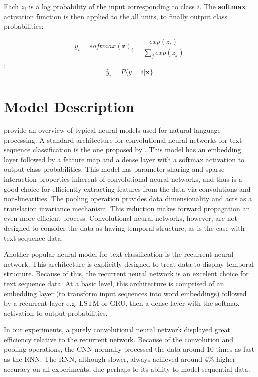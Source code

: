 Each  $z_i$ is a log probability of the input corresponding to class $i$. The \textbf{softmax} activation function is then applied to
the all units, to finally output class probabilities:

\[\hat{y}_i = softmax(\bm{z})_i = \frac{exp(z_i)}{\sum_j exp(z_j)}\],
\[\hat{y}_i = P\{y=i|\bm{x}\}\]

\section{Model Description}

\cite{yin2017comparative} provide an overview of typical neural models used for natural language processing.
A standard architecture for convolutional neural networks for text sequence classification is the one proposed by
\cite{kim2014convolutional}. This model has an embedding layer followed by a feature map and a dense layer with a softmax activation
to output class probabilities. This model has parameter sharing and sparse interaction properties inherent of convolutional
neural networks, and thus is a good choice for efficiently extracting features from the data via convolutions and non-linearities.
The pooling operation provides data dimensionality and acts as a translation invariance mechanism. This reduction makes forward propagation
an even more efficient process. Convolutional neural networks, however, are not designed to consider the data as having temporal
structure, as is the case with text sequence data.

Another popular neural model for text classification is the recurrent neural network. This architecture is explicitly designed to treat
data to display temporal structure. Because of this, the recurrent neural network is an excelent choice for text sequence data.
At a basic level, this architecture is comprised of an embedding layer (to transform input sequences into word embeddings)
followed by a recurrent layer e.g. LSTM or GRU, then a dense layer with the softmax activation to output probabilities.

In our experiments, a purely convolutional neural network displayed great efficiency relative to the recurrent network. Because of the convolution
and pooling operations, the CNN normally processed the data around 10 times as fast as the RNN. The RNN, although slower,
always achieved around 4\% higher accuracy on all experiments, due perhaps to its ability to model sequential data.

